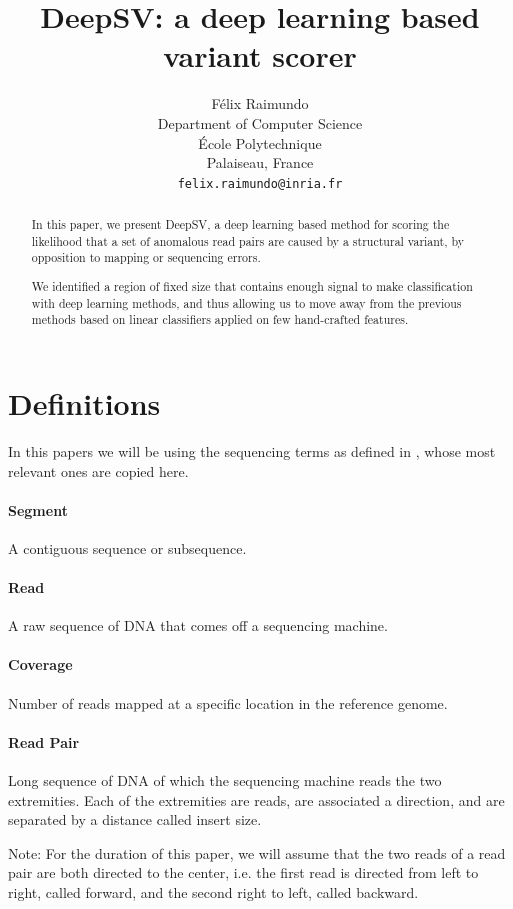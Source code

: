 \documentclass{article}
\title{DeepSV: a deep learning based variant scorer}
\author{
  Félix Raimundo\\
  Department of Computer Science\\
  École Polytechnique\\
  Palaiseau, France\\
  \texttt{felix.raimundo@inria.fr}
}
\begin{document}
\maketitle

\begin{abstract}
  In this paper, we present DeepSV, a deep learning based method for scoring the likelihood that a set of anomalous read pairs are caused by a structural variant, by opposition to mapping or sequencing errors.
  
  We identified a region of fixed size that contains enough signal to make classification
  with deep learning methods, and thus allowing us to move away from the previous methods
  based on linear classifiers applied on few hand-crafted features.
\end{abstract}

\section{Definitions}

In this papers we will be using the sequencing terms as defined in \cite{li_sequence_2009}, whose most
relevant ones are copied here.

\paragraph{Segment} A contiguous sequence or subsequence.
\paragraph{Read} A raw sequence of DNA that comes off a sequencing machine.
\paragraph{Coverage} Number of reads mapped at a specific location in the reference genome.
\paragraph{Read Pair} Long sequence of DNA of which the sequencing machine reads the two extremities. Each of the extremities are reads, are associated a direction, and are separated by a distance called insert size.

Note: For the duration of this paper, we will assume that the two reads of a read pair are both directed to the center, i.e. the first read is directed from left to right, called forward, and the second right to left, called backward.
\end{document}
